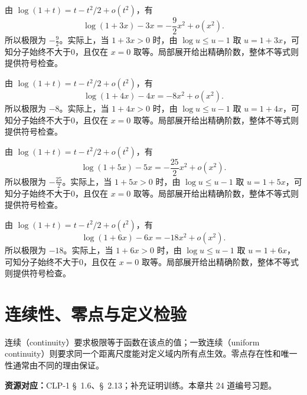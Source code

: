 \documentclass[12pt,fontset=fandol]{ctexart}
\begin{document}
\begin{solve}\label{ans:c5q21}
由 $\log(1+t)=t-t^2/2+o(t^2)$，有
\[
\log(1+3x)-3x=-\frac{9}{2}x^2+o(x^2).
\]
所以极限为 $-\frac{9}{2}$。实际上，当 $1+3x>0$ 时，由 $\log u\le u-1$ 取 $u=1+3x$，可知分子始终不大于0，且仅在 $x=0$ 取等。局部展开给出精确阶数，整体不等式则提供符号检查。
\end{solve}

\begin{solve}\label{ans:c5q22}
由 $\log(1+t)=t-t^2/2+o(t^2)$，有
\[
\log(1+4x)-4x=-8x^2+o(x^2).
\]
所以极限为 $-8$。实际上，当 $1+4x>0$ 时，由 $\log u\le u-1$ 取 $u=1+4x$，可知分子始终不大于0，且仅在 $x=0$ 取等。局部展开给出精确阶数，整体不等式则提供符号检查。
\end{solve}

\begin{solve}\label{ans:c5q23}
由 $\log(1+t)=t-t^2/2+o(t^2)$，有
\[
\log(1+5x)-5x=-\frac{25}{2}x^2+o(x^2).
\]
所以极限为 $-\frac{25}{2}$。实际上，当 $1+5x>0$ 时，由 $\log u\le u-1$ 取 $u=1+5x$，可知分子始终不大于0，且仅在 $x=0$ 取等。局部展开给出精确阶数，整体不等式则提供符号检查。
\end{solve}

\begin{solve}\label{ans:c5q24}
由 $\log(1+t)=t-t^2/2+o(t^2)$，有
\[
\log(1+6x)-6x=-18x^2+o(x^2).
\]
所以极限为 $-18$。实际上，当 $1+6x>0$ 时，由 $\log u\le u-1$ 取 $u=1+6x$，可知分子始终不大于0，且仅在 $x=0$ 取等。局部展开给出精确阶数，整体不等式则提供符号检查。
\end{solve}

\clearpage
\section{连续性、零点与定义检验}\label{sec:ch6}
连续（continuity）要求极限等于函数在该点的值；一致连续（uniform continuity）则要求同一个距离尺度能对定义域内所有点生效。零点存在性和唯一性通常由不同的理由保证。

\textbf{资源对应：}CLP-1 \S~1.6、\S~2.13；补充证明训练。本章共 24 道编号习题。
\end{document}
